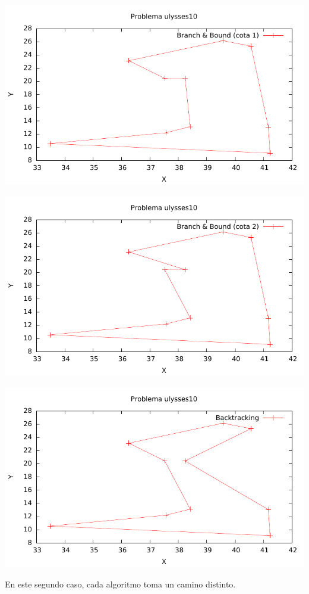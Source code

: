 \includegraphics[width=15cm]{img/ulysses10_tsp_1}

\includegraphics[width=15cm]{img/ulysses10_tsp_2}

\includegraphics[width=15cm]{img/ulysses10_tsp_3}

En este segundo caso, cada algoritmo toma un camino distinto.

